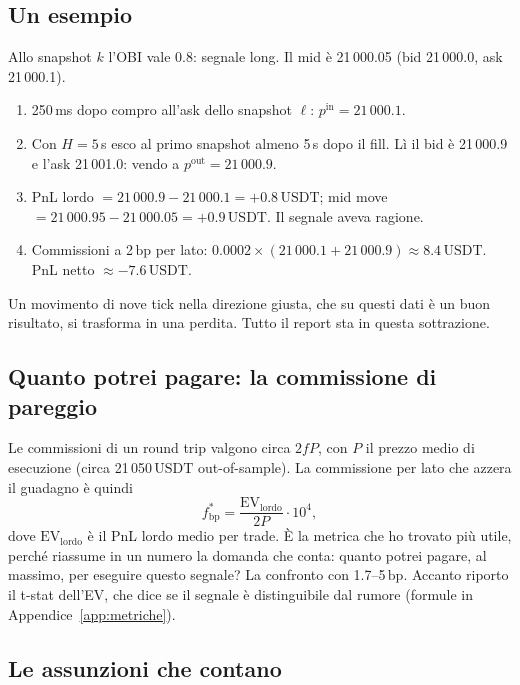\documentclass[a4paper,11pt]{article}
\newcommand{\EV}{\mathrm{EV}}
\newcommand{\bp}{\ensuremath{\,\mathrm{bp}}}
\newcommand{\usdt}{\ensuremath{\,\mathrm{USDT}}}
\begin{document}
\subsection{Un esempio}

Allo snapshot $k$ l'OBI vale $0.8$: segnale long. Il mid è 21\,000.05 (bid 21\,000.0, ask
21\,000.1).
\begin{enumerate}[leftmargin=*]
  \item 250\,ms dopo compro all'ask dello snapshot $\ell$: $p^{\mathrm{in}} = 21\,000.1$.
  \item Con $H = 5$\,s esco al primo snapshot almeno 5\,s dopo il fill. Lì il bid è
        21\,000.9 e l'ask 21\,001.0: vendo a $p^{\mathrm{out}} = 21\,000.9$.
  \item PnL lordo $= 21\,000.9 - 21\,000.1 = +0.8\usdt{}$; mid move $= 21\,000.95 -
        21\,000.05 = +0.9\usdt{}$. Il segnale aveva ragione.
  \item Commissioni a 2\bp{} per lato: $0.0002 \times (21\,000.1 + 21\,000.9) \approx
        8.4\usdt{}$. PnL netto $\approx -7.6\usdt{}$.
\end{enumerate}
Un movimento di nove tick nella direzione giusta, che su questi dati è un buon risultato, si
trasforma in una perdita. Tutto il report sta in questa sottrazione.

\subsection{Quanto potrei pagare: la commissione di pareggio}

Le commissioni di un round trip valgono circa $2fP$, con $P$ il prezzo medio di esecuzione
(circa 21\,050\usdt{} out-of-sample). La commissione per lato che azzera il guadagno è quindi
\begin{equation}
  f^{*}_{\mathrm{bp}} = \frac{\EV_{\mathrm{lordo}}}{2P}\cdot 10^{4},
  \label{eq:breakeven}
\end{equation}
dove $\EV_{\mathrm{lordo}}$ è il PnL lordo medio per trade. È la metrica che ho trovato più
utile, perché riassume in un numero la domanda che conta: quanto potrei pagare, al massimo, per
eseguire questo segnale? La confronto con 1.7--5\bp{}. Accanto riporto il t-stat dell'EV, che
dice se il segnale è distinguibile dal rumore (formule in Appendice~\ref{app:metriche}).

\subsection{Le assunzioni che contano}
\end{document}
